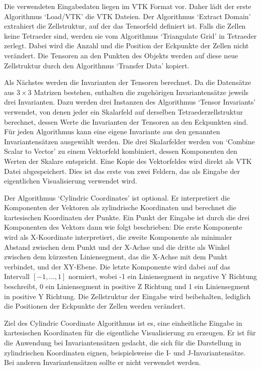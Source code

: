 \documentclass[a4paper,fontsize=12pt,toc=bib,halfparskip]{scrartcl}
\begin{document}
Die verwendeten Eingabedaten liegen im VTK Format\cite{avila2010vtk} vor. Daher l\"adt der erste Algorithmus `Load/VTK' die VTK Dateien. Der Algorithmus `Extract Domain' extrahiert die Zellstruktur, auf der das Tensorfeld definiert ist. Falls die Zellen keine Tetraeder sind, werden sie vom Algorithmus `Triangulate Grid' in Tetraeder zerlegt. Dabei wird die Anzahl und die Position der Eckpunkte der Zellen nicht ver\"andert. Die Tensoren an den Punkten des Objekts werden auf diese neue Zellstruktur durch den Algorithmus `Transfer Data' kopiert. 

Als N\"achstes werden die Invarianten der Tensoren berechnet. Da die Datens\"atze aus $3\times3$ Matrizen bestehen, enthalten die zugeh\"origen Invariantens\"atze jeweils drei Invarianten. Dazu werden drei Instanzen des Algorithmus `Tensor Invariants' verwendet, von denen jeder ein Skalarfeld auf derselben Tetraederzellstruktur berechnet, dessen Werte die Invarianten der Tensoren an den Eckpunkten sind. F\"ur jeden Algorithmus kann eine eigene Invariante aus den genannten Invariantens\"atzen ausgew\"ahlt werden. Die drei Skalarfelder werden von `Combine Scalar to Vector' zu einem Vektorfeld kombiniert, dessen Komponenten den Werten der Skalare entspricht. Eine Kopie des Vektorfeldes wird direkt als VTK Datei abgespeichert. Dies ist das erste von zwei Feldern, das als Eingabe der eigentlichen Visualisierung verwendet wird.

Der Algorithmus `Cylindric Coordinates' ist optional. Er interpretiert die Komponenten der Vektoren als zylindrische Koordinaten und berechnet die kartesischen Koordinaten der Punkte. Ein Punkt der Eingabe ist durch die drei Komponenten des Vektors dann wie folgt beschrieben: Die erste Komponente wird als X-Koordinate interpretiert, die zweite Komponente als minimaler Abstand zwischen dem Punkt und der X-Achse und die dritte als Winkel zwischen dem k\"urzesten Liniensegment, das die X-Achse mit dem Punkt verbindet, und der XY-Ebene. Die letzte Komponente wird dabei auf das Intervall $[-1,\dots,1]$ normiert, wobei -1 ein Liniensegment in negative Y Richtung beschreibt, 0 ein Liniensegment in positive Z Richtung und 1 ein Liniensegment in positive Y Richtung. Die Zellstruktur der Eingabe wird beibehalten, lediglich die Positionen der Eckpunkte der Zellen werden ver\"andert.

Ziel des Cylindric Coordinate Algorithmus ist es, eine einheitliche Eingabe in kartesischen Koordinaten f\"ur die eigentliche Visualisierung zu erzeugen. Er ist f\"ur die Anwendung bei Invariantens\"atzen gedacht, die sich f\"ur die Darstellung in zylindrischen Koordinaten eignen, beispielsweise die I- und J-Invariantens\"atze. Bei anderen Invariantens\"atzen sollte er nicht verwendet werden.
\end{document}

